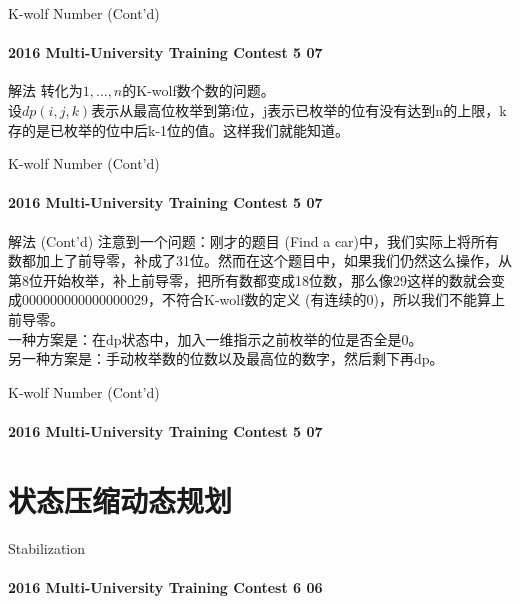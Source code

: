 \documentclass[hyperref={unicode=true}]{beamer}
\theoremstyle{definition}
\theoremstyle{proof}
\begin{document}
\begin{frame}{K-wolf Number (Cont'd)}\framesubtitle{2016 Multi-University Training Contest 5 07}
  \begin{exampleblock}{解法}
    转化为$1,\ldots,n$的K-wolf数个数的问题。\\
    设$dp(i,j,k)$表示从最高位枚举到第i位，j表示已枚举的位有没有达到n的上限，k存的是已枚举的位中后k-1位的值。这样我们就能知道。\\
  \end{exampleblock}
\end{frame}

\begin{frame}{K-wolf Number (Cont'd)}\framesubtitle{2016 Multi-University Training Contest 5 07}
  \begin{exampleblock}{解法 (Cont'd)}
    注意到一个问题：刚才的题目 (Find a car)中，我们实际上将所有数都加上了前导零，补成了31位。然而在这个题目中，如果我们仍然这么操作，从第8位开始枚举，补上前导零，把所有数都变成18位数，那么像29这样的数就会变成000000000000000029，不符合K-wolf数的定义 (有连续的0)，所以我们不能算上前导零。\\
    \pause{}一种方案是：在dp状态中，加入一维指示之前枚举的位是否全是0。\\
    另一种方案是：手动枚举数的位数以及最高位的数字，然后剩下再dp。
  \end{exampleblock}
\end{frame}

\begin{frame}{K-wolf Number (Cont'd)}\framesubtitle{2016 Multi-University Training Contest 5 07}
\end{frame}

\section{状态压缩动态规划}

\begin{frame}{Stabilization}\framesubtitle{2016 Multi-University Training Contest 6 06}
\end{frame}
\end{document}
